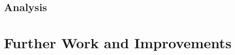 
\subsection{Analysis}\label{subsec:analysis}



\section{Further Work and Improvements}\label{sec:further-work-and-improvements}

